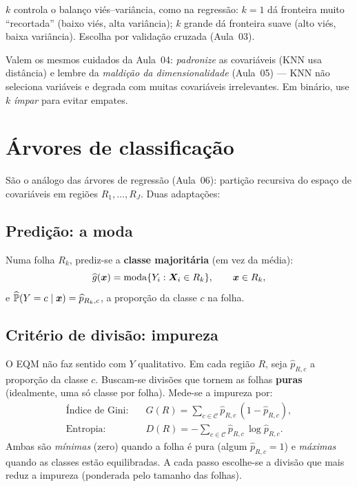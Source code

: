 \documentclass[11pt,a4paper]{article}
\begin{document}
\begin{ideia}
$k$ controla o balanço viés--variância, como na regressão: $k=1$ dá fronteira muito
``recortada'' (baixo viés, alta variância); $k$ grande dá fronteira suave (alto
viés, baixa variância). Escolha por validação cruzada (Aula~03).
\end{ideia}

\begin{atencao}
Valem os mesmos cuidados da Aula~04: \emph{padronize} as covariáveis (KNN usa
distância) e lembre da \emph{maldição da dimensionalidade} (Aula~05) --- KNN não
seleciona variáveis e degrada com muitas covariáveis irrelevantes. Em binário, use
$k$ \emph{ímpar} para evitar empates.
\end{atencao}

\section{Árvores de classificação}
São o análogo das árvores de regressão (Aula~06): partição recursiva do espaço de
covariáveis em regiões $R_1,\dots,R_J$. Duas adaptações:

\subsection{Predição: a moda}
Numa folha $R_k$, prediz-se a \textbf{classe majoritária} (em vez da média):
\begin{equation}\label{eq:arvcls}
  \widehat{g}(\bm{x}) = \operatorname{moda}\{Y_i : \bm{X}_i\in R_k\},\qquad \bm{x}\in R_k,
\end{equation}
e $\widehat{\mathbb{P}}(Y=c\mid\bm{x})=\widehat p_{R_k,c}$, a proporção da classe $c$ na folha.

\subsection{Critério de divisão: impureza}
O EQM não faz sentido com $Y$ qualitativo. Em cada região $R$, seja
$\widehat p_{R,c}$ a proporção da classe $c$. Buscam-se divisões que tornem as
folhas \textbf{puras} (idealmente, uma só classe por folha). Mede-se a impureza por:
\begin{align}
  \text{Índice de Gini:}\quad & G(R) = \sum_{c\in\mathcal{C}} \widehat p_{R,c}\,(1-\widehat p_{R,c}),
  \label{eq:gini}\\
  \text{Entropia:}\quad & D(R) = -\sum_{c\in\mathcal{C}} \widehat p_{R,c}\,\log \widehat p_{R,c}.
  \label{eq:entropia}
\end{align}
Ambas são \emph{mínimas} (zero) quando a folha é pura (algum $\widehat p_{R,c}=1$) e
\emph{máximas} quando as classes estão equilibradas. A cada passo escolhe-se a
divisão que mais reduz a impureza (ponderada pelo tamanho das folhas).
\end{document}

